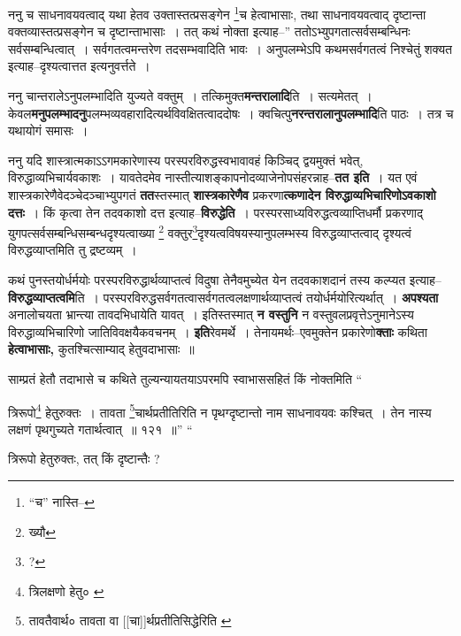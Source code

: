 \documentclass[article,12pt,a4paper]{memoir}
\begin{document}
	ननु च साधनावयवत्वाद् यथा हेतव उक्तास्तत्प्रसङ्गेन \footnote{“च” नास्ति--\cite{dp-msD}}च हेत्वाभासाः, तथा साधनावयवत्वाद् दृष्टान्ता वक्तव्यास्तत्प्रसङ्गेन च दृष्टान्ताभासाः । तत् कथं नोक्ता इत्याह--” ततोऽभ्युपगतात्सर्वसम्बन्धिनः सर्वसम्बन्धित्वात् । सर्वगतत्वमन्तरेण तदसम्भवादिति भावः । अनुपलम्भेऽपि कथमसर्वगतत्वं निश्चेतुं शक्यत इत्याह--दृश्यत्वात्तत इत्यनुवर्त्तते ।
	\pend
      

	  \pstart ननु चान्तरालेऽनुपलम्भादिति युज्यते वक्तुम् । तत्किमुक्त\textbf{मन्तरालादि}ति । सत्यमेतत् । केवल\textbf{मनुपलम्भादनु}पलम्भव्यवहारादित्यर्थविवक्षितत्वाददोषः । क्वचित्पु\textbf{नरन्तरालानुपलम्भादि}ति पाठः । तत्र च यथायोगं समासः ।
	\pend
      

	  \pstart ननु यदि शास्त्रात्मकाऽऽगमकारेणास्य परस्परविरुद्धस्वभावावहं किञ्चिद् द्वयमुक्तं भवेत्, विरुद्धाव्यभिचार्यवकाशः । यावतेदमेव नास्तीत्याशङ्कापनोदव्याजेनोपसंहरन्नाह--\textbf{तत इति} । \leavevmode{} यत एवं शास्त्रकारेणैवेदञ्चेदञ्चाभ्युपगतं \textbf{तत}स्तस्मात् \textbf{शास्त्रकारेणैव} प्रकरणा\textbf{त्कणादेन विरुद्धाव्यभिचारिणोऽवकाशो दत्तः} । किं कृत्वा तेन तदवकाशो दत्त इत्याह--\textbf{विरुद्धेति} । परस्परसाध्यविरुद्धत्वव्याप्तिधर्मौ प्रकरणाद् युगपत्सर्वसम्बन्धिसम्बन्धदृश्यत्वाख्या \footnote{ख्यौ} वक्तुर\footnote{?}दृश्यत्वविषयस्यानुपलम्भस्य विरुद्धव्याप्तत्वाद् दृश्यत्वं विरुद्धव्याप्तमिति तु द्रष्टव्यम् ।
	\pend
      

	  \pstart कथं पुनस्तयोर्धर्मयोः परस्परविरुद्धार्थव्याप्तत्वं विदुषा तेनैवमुच्येत येन तदवकाशदानं तस्य कल्प्यत इत्याह--\textbf{विरुद्धव्याप्तत्वमि}ति । परस्परविरुद्धसर्वगतत्वासर्वगतत्वलक्षणार्थव्याप्तत्वं तयोर्धर्मयोरित्यर्थात् । \textbf{अपश्यता} अनालोचयता भ्रान्त्या तावदभिधायेति यावत् । इतिस्तस्मात् \textbf{न वस्तुनि} न वस्तुवलप्रवृत्तेऽनुमानेऽस्य विरुद्धाव्यभिचारिणो जातिविवक्षयैकवचनम् । \textbf{इति}रेवमर्थे । तेनायमर्थः--एवमुक्तेन प्रकारेणो\textbf{क्ताः} कथिता \textbf{हेत्वाभासाः,} कुतश्चित्साम्याद् हेतुवदाभासाः ॥
	\pend
      

	  \pstart साम्प्रतं हेतौ तदाभासे च कथिते तुल्यन्यायतयाऽपरमपि स्वाभाससहितं किं नोक्तमिति  \leavevmode{} “
	  
	त्रिरूपो\footnote{त्रिलक्षणो हेतु० \cite{dp-msC}} हेतुरुक्तः । तावता \footnote{तावतैवार्थ० \cite{dp-msB} \cite{dp-msD} \cite{dp-edP} \cite{dp-edH} \cite{dp-edE} \cite{dp-edN} तावता वा [[चा]]र्थप्रतीतिसिद्धेरिति \cite{dp-msC}}चार्थप्रतीतिरिति न पृथग्दृष्टान्तो नाम साधनावयवः कश्चित् । तेन नास्य लक्षणं पृथगुच्यते गतार्थत्वात् ॥ १२१ ॥” “
	  
	त्रिरूपो हेतुरुक्तः, तत् किं दृष्टान्तैः ? 
	  
\end{document}
